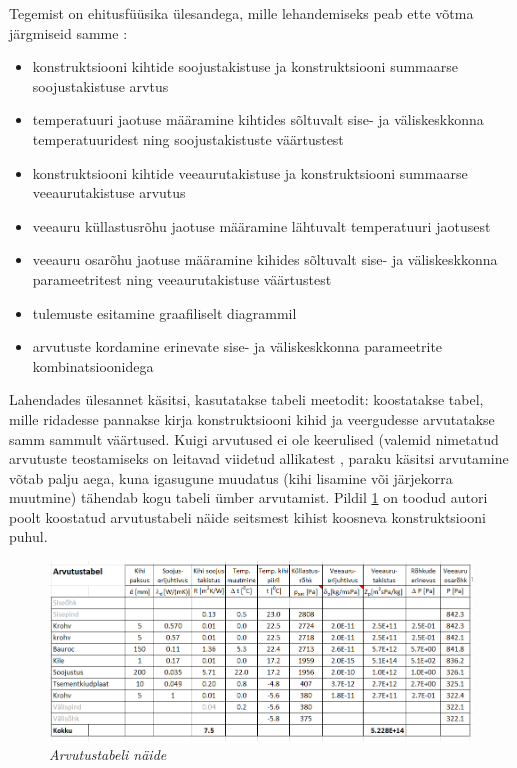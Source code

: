 Tegemist on ehitusfüüsika ülesandega, mille lehandemiseks peab ette võtma järgmiseid samme \cite{iso_13788}:
\begin{itemize}
    \item konstruktsiooni kihtide soojustakistuse ja konstruktsiooni summaarse soojustakistuse arvtus
    \item temperatuuri jaotuse määramine kihtides sõltuvalt sise- ja väliskeskkonna temperatuuridest ning 
    soojustakistuste väärtustest 
    \item konstruktsiooni kihtide veeaurutakistuse ja konstruktsiooni summaarse veeaurutakistuse arvutus
    \item veeauru küllastusrõhu jaotuse määramine lähtuvalt temperatuuri jaotusest
    \item veeauru osarõhu jaotuse määramine kihides sõltuvalt sise- ja väliskeskkonna parameetritest ning 
    veeaurutakistuse väärtustest 
    \item tulemuste esitamine graafiliselt diagrammil 
    \item arvutuste kordamine erinevate sise- ja väliskeskkonna parameetrite kombinatsioonidega
\end{itemize}

Lahendades ülesannet käsitsi, kasutatakse tabeli meetodit: koostatakse tabel, mille ridadesse pannakse 
kirja konstruktsiooni kihid ja veergudesse arvutatakse samm sammult väärtused. 
Kuigi arvutused ei ole keerulised (valemid nimetatud arvutuste teostamiseks on 
leitavad viidetud allikatest \cite{building_physics_abc}\cite{iso_13788}\cite{ehituskonstruktor}, paraku käsitsi arvutamine 
võtab palju aega, kuna igasugune muudatus (kihi lisamine või järjekorra muutmine) tähendab 
kogu tabeli ümber arvutamist. Pildil \ref{fig:excel_table_sample} on toodud autori poolt koostatud arvutustabeli näide
seitsmest kihist koosneva konstruktsiooni puhul.
 
\begin{figure}[ht]
    \centering
    \includegraphics[width=1\textwidth]{figures/problem_statement/04_calc_table.png}
    \caption[Näide niiskustehnilise analüüsi tulemuste esitamisest tabelis]{\textit{Arvutustabeli näide}}
    \label{fig:excel_table_sample}
\end{figure}

